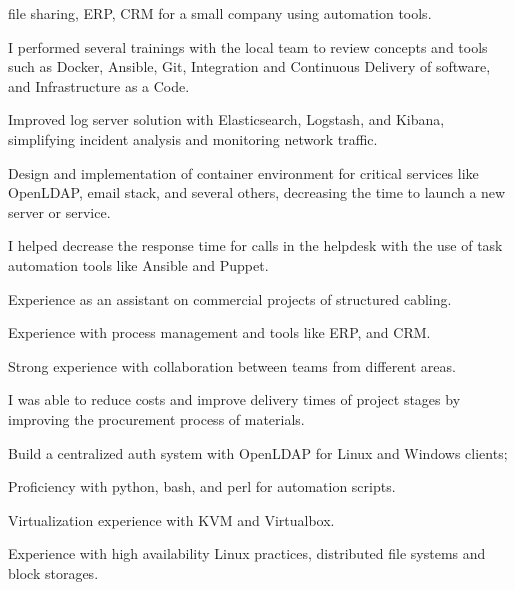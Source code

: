 \documentclass[]{deedy-resume-openfont}
\begin{document}
\begin{minipage}[t]{0.66\textwidth}
\begin{tightemize}
        file sharing, ERP, CRM for a small company using automation tools.
    \end{tightemize}
    \begin{tightemize}
    \item I performed several trainings with the local team to review concepts
        and tools such as Docker, Ansible, Git, Integration and Continuous
        Delivery of software, and Infrastructure as a Code.
    \item Improved log server solution with Elasticsearch, Logstash, and
        Kibana, simplifying incident analysis and monitoring network traffic.
    \item Design and implementation of container environment for critical
        services like OpenLDAP, email stack, and several others, decreasing the
        time to launch a new server or service.
    \item I helped decrease the response time for calls in the helpdesk with
        the use of task automation tools like Ansible and Puppet.
    \end{tightemize}
    \begin{tightemize}
    \item Experience as an assistant on commercial projects of structured
        cabling.
    \item Experience with process management and tools like ERP, and CRM.
    \item Strong experience with collaboration between teams from different
        areas.
    \item I was able to reduce costs and improve delivery times of project
        stages by improving the procurement process of materials.
    \end{tightemize}
    \begin{tightemize}
    \item Build a centralized auth system with OpenLDAP for
        Linux and Windows clients;
    \item Proficiency with python, bash, and perl for automation scripts.
    \item Virtualization experience with KVM and Virtualbox.
    \item Experience with high availability Linux practices, distributed file
        systems and block storages.
    \end{tightemize}

\end{minipage}
\end{document}
